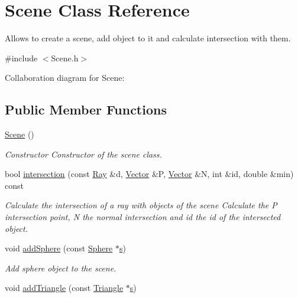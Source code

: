 \hypertarget{classScene}{}\section{Scene Class Reference}
\label{classScene}


Allows to create a scene, add object to it and calculate intersection with them.  




{\ttfamily \#include $<$Scene.\+h$>$}



Collaboration diagram for Scene\+:
\subsection*{Public Member Functions}
\begin{DoxyCompactItemize}
\item 
\mbox{\label{classScene_ad10176d75a9cc0da56626f682d083507}} 
\hyperlink{classScene_ad10176d75a9cc0da56626f682d083507}{Scene} ()
\begin{DoxyCompactList}\small\item\em Constructor Constructor of the scene class. \end{DoxyCompactList}\item 
bool \hyperlink{classScene_a2006d6fa80e8bf343da5a8ed3d1f5140}{intersection} (const \hyperlink{classRay}{Ray} \&d, \hyperlink{classVector}{Vector} \&P, \hyperlink{classVector}{Vector} \&N, int \&id, double \&min) const
\begin{DoxyCompactList}\small\item\em Calculate the intersection of a ray with objects of the scene Calculate the P intersection point, N the normal intersection and id the id of the intersected object. \end{DoxyCompactList}\item 
void \hyperlink{classScene_aa1cc40909ebbe9ed5933566d9a3663d2}{add\+Sphere} (const \hyperlink{classSphere}{Sphere} $\ast$\hyperlink{Main_8cpp_aecc1396fc611f6e71d5d70228e7b089a}{s})
\begin{DoxyCompactList}\small\item\em Add sphere object to the scene. \end{DoxyCompactList}\item 
void \hyperlink{classScene_a2a8ed37427379fed62a9a71e7d266223}{add\+Triangle} (const \hyperlink{classTriangle}{Triangle} $\ast$\hyperlink{Main_8cpp_aecc1396fc611f6e71d5d70228e7b089a}{s})

\end{DoxyCompactItemize}
